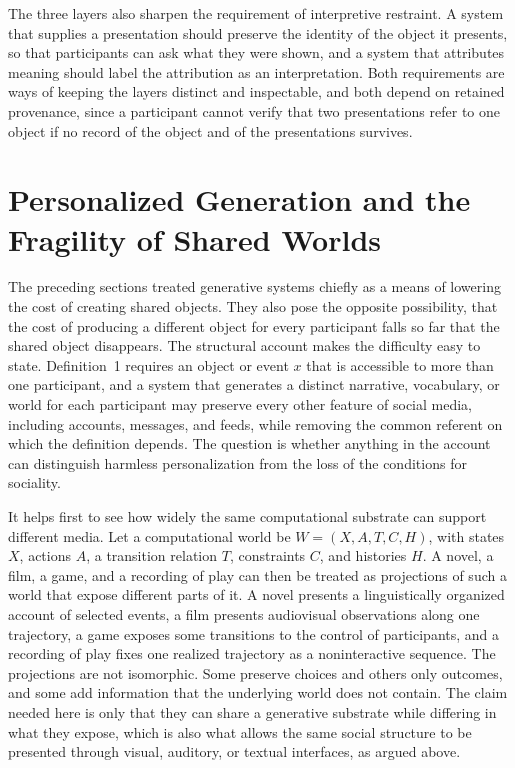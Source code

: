 \documentclass[11pt]{article}
\theoremstyle{remark}
\newcommand{\A}{A}
\newcommand{\Hh}{H}
\begin{document}
The three layers also sharpen the requirement of interpretive restraint. A system that supplies a presentation should preserve the identity of the object it presents, so that participants can ask what they were shown, and a system that attributes meaning should label the attribution as an interpretation. Both requirements are ways of keeping the layers distinct and inspectable, and both depend on retained provenance, since a participant cannot verify that two presentations refer to one object if no record of the object and of the presentations survives.

\section{Personalized Generation and the Fragility of Shared Worlds}
\label{sec:personalization}

The preceding sections treated generative systems chiefly as a means of lowering the cost of creating shared objects. They also pose the opposite possibility, that the cost of producing a different object for every participant falls so far that the shared object disappears. The structural account makes the difficulty easy to state. Definition~1 requires an object or event $x$ that is accessible to more than one participant, and a system that generates a distinct narrative, vocabulary, or world for each participant may preserve every other feature of social media, including accounts, messages, and feeds, while removing the common referent on which the definition depends. The question is whether anything in the account can distinguish harmless personalization from the loss of the conditions for sociality.

It helps first to see how widely the same computational substrate can support different media. Let a computational world be $W=(X,\A,T,C,\Hh)$, with states $X$, actions $\A$, a transition relation $T$, constraints $C$, and histories $\Hh$. A novel, a film, a game, and a recording of play can then be treated as projections of such a world that expose different parts of it. A novel presents a linguistically organized account of selected events, a film presents audiovisual observations along one trajectory, a game exposes some transitions to the control of participants, and a recording of play fixes one realized trajectory as a noninteractive sequence. The projections are not isomorphic. Some preserve choices and others only outcomes, and some add information that the underlying world does not contain. The claim needed here is only that they can share a generative substrate while differing in what they expose, which is also what allows the same social structure to be presented through visual, auditory, or textual interfaces, as argued above.
\end{document}
